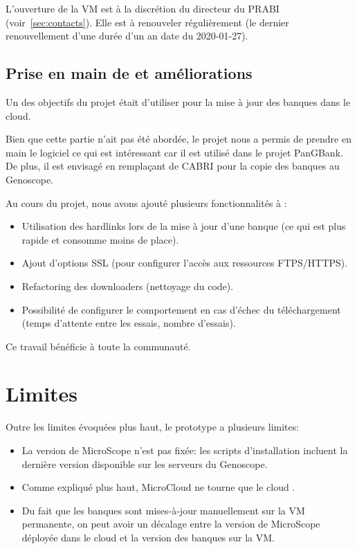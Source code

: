 \begin{warningbox}
    L'ouverture de la VM est à la discrétion du directeur du PRABI (voir~\autoref{sec:contacts}).
    Elle est à renouveler régulièrement (le dernier renouvellement d'une durée d'un an date du 2020-01-27).
\end{warningbox}

\subsection{Prise en main de  et améliorations}\label{subsec:biomaj}

Un des objectifs du projet était d'utiliser  pour la mise à jour des banques dans le cloud.

Bien que cette partie n'ait pas été abordée, le projet nous a permis de prendre en main le logiciel
ce qui est intéressant car il est utilisé dans le projet PanGBank.
De plus, il est envisagé en remplaçant de CABRI pour la copie des banques au Genoscope.

Au cours du projet, nous avons ajouté plusieurs fonctionnalités à :
\begin{itemize}
    \item Utilisation des hardlinks lors de la mise à jour d'une banque (ce qui est plus rapide et consomme moins de place).
    \item Ajout d'options SSL (pour configurer l'accès aux ressources FTPS/HTTPS).
    \item Refactoring des downloaders (nettoyage du code).
    \item Possibilité de configurer le comportement en cas d'échec du téléchargement (temps d'attente entre les essais, nombre d'essais).
\end{itemize}

Ce travail bénéficie à toute la communauté.

\section{Limites}

Outre les limites évoquées plus haut, le prototype a plusieurs limites:
\begin{itemize}
    \item La version de MicroScope n'est pas fixée: les scripts d'installation incluent la dernière version disponible sur les serveurs du Genoscope.
    \item Comme expliqué plus haut, MicroCloud ne tourne que le cloud .
    \item Du fait que les banques sont mises-à-jour manuellement sur la VM permanente, on peut avoir un décalage entre la version de MicroScope déployée dans le cloud
          et la version des banques sur la VM.
\end{itemize}

